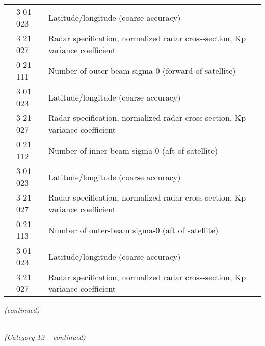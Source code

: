 \begin{longtable}[]{@{}llll@{}}
& 3 01 023 & Latitude/longitude (coarse accuracy) &\tabularnewline
& 3 21 027 & Radar specification, normalized radar cross-section, Kp variance coefficient &\tabularnewline
& 0 21 111 & Number of outer-beam sigma-0 (forward of satellite) &\tabularnewline
& 3 01 023 & Latitude/longitude (coarse accuracy) &\tabularnewline
& 3 21 027 & Radar specification, normalized radar cross-section, Kp variance coefficient &\tabularnewline
& 0 21 112 & Number of inner-beam sigma-0 (aft of satellite) &\tabularnewline
& 3 01 023 & Latitude/longitude (coarse accuracy) &\tabularnewline
& 3 21 027 & Radar specification, normalized radar cross-section, Kp variance coefficient &\tabularnewline
& 0 21 113 & Number of outer-beam sigma-0 (aft of satellite) &\tabularnewline
& 3 01 023 & Latitude/longitude (coarse accuracy) &\tabularnewline
& 3 21 027 & Radar specification, normalized radar cross-section, Kp variance coefficient &\tabularnewline
\bottomrule
\end{longtable}

\emph{(continued)}

\emph{\\
(Category 12 -- continued)}

